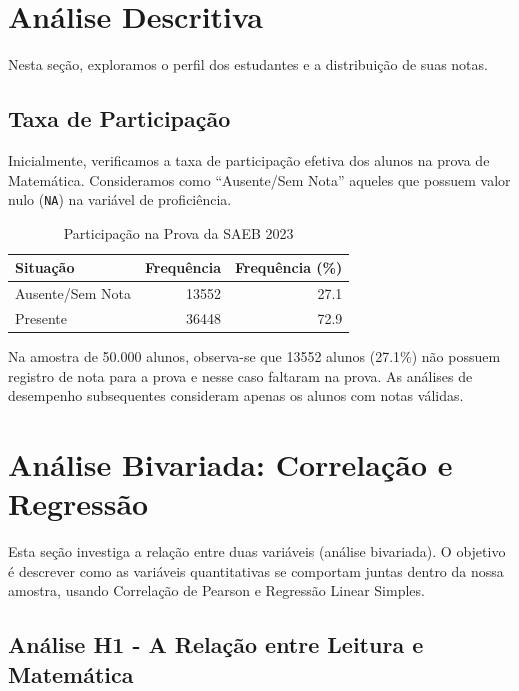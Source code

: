 \documentclass[
]{article}
\begin{document}
\section{Análise Descritiva}\label{anuxe1lise-descritiva}

Nesta seção, exploramos o perfil dos estudantes e a distribuição de suas
notas.

\subsection{Taxa de Participação}\label{taxa-de-participauxe7uxe3o}

Inicialmente, verificamos a taxa de participação efetiva dos alunos na
prova de Matemática. Consideramos como ``Ausente/Sem Nota'' aqueles que
possuem valor nulo (\texttt{NA}) na variável de proficiência.

\newpage

\begin{longtable}[t]{lrr}
\caption{\label{tab:participação}Participação na Prova da SAEB 2023}\\
\toprule
Situação & Frequência & Frequência (\%)\\
\midrule
Ausente/Sem Nota & 13552 & 27.1\\
Presente & 36448 & 72.9\\
\bottomrule
\end{longtable}

Na amostra de 50.000 alunos, observa-se que 13552 alunos (27.1\%) não
possuem registro de nota para a prova e nesse caso faltaram na prova. As
análises de desempenho subsequentes consideram apenas os alunos com
notas válidas.

\section{Análise Bivariada: Correlação e
Regressão}\label{anuxe1lise-bivariada-correlauxe7uxe3o-e-regressuxe3o}

Esta seção investiga a relação entre duas variáveis (análise bivariada).
O objetivo é descrever como as variáveis quantitativas se comportam
juntas dentro da nossa amostra, usando Correlação de Pearson e Regressão
Linear Simples.

\subsection{Análise H1 - A Relação entre Leitura e
Matemática}\label{anuxe1lise-h1---a-relauxe7uxe3o-entre-leitura-e-matemuxe1tica}
\end{document}
